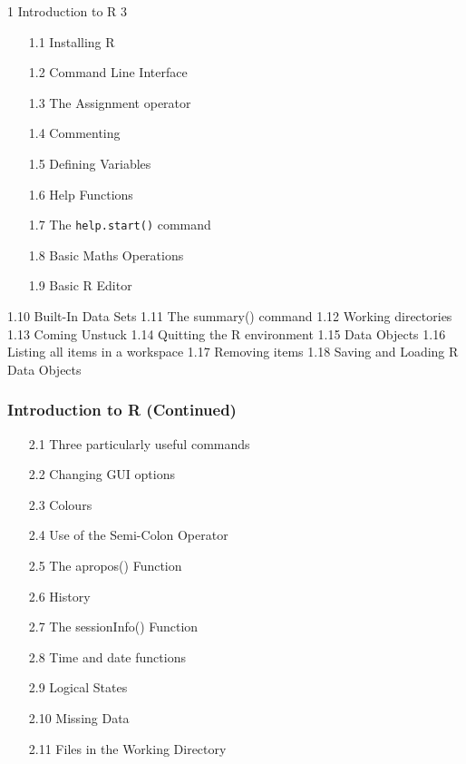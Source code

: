 \documentclass{beamer}
\begin{document}
	\begin{frame}1 Introduction to R 3
		\begin{itemize}
			\item[1.1] Installing R      
			\item[1.2] Command Line Interface     
			\item[1.3] The Assignment operator     
			\item[1.4] Commenting      
			\item[1.5] Defining Variables     
			\item[1.6] Help Functions      
			\item[1.7] The \texttt{help.start()} command     
			\item[1.8] Basic Maths Operations     
			\item[1.9] Basic R Editor      
		\end{itemize}
	\end{frame}
	\begin{frame}
		1.10 Built-In Data Sets      
		1.11 The summary() command     
		1.12 Working directories      
		1.13 Coming Unstuck    
		1.14 Quitting the R environment   
		1.15 Data Objects  
		1.16 Listing all items in a workspace     
		1.17 Removing items   
		1.18 Saving and Loading R Data Objects    
	\end{frame}
	\begin{frame}
		\frametitle{Introduction to R (Continued) }
		\begin{itemize}
			\item[2.1] Three particularly useful commands    
			\item[2.2] Changing GUI options     
			\item[2.3] Colours      
			\item[2.4] Use of the Semi-Colon Operator     
			\item[2.5] The apropos() Function     
			\item[2.6] History       
			\item[2.7] The sessionInfo() Function     
			\item[2.8] Time and date functions     
			\item[2.9] Logical States      
			\item[2.10] Missing Data      
			\item[2.11] Files in the Working Directory     
		\end{itemize}
	\end{frame}
\end{document}
